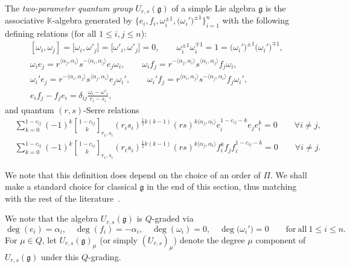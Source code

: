 \documentclass[pdftex]{sigma}
\numberwithin{equation}{section}
\newcommand{\qbinom}{\genfrac{[}{]}{0pt}{}}
\newcommand{\fg}{\mathfrak{g}}
\begin{document}
\begin{Definition}\label{def:general_2param}
The \textit{two-parameter quantum group} $U_{r,s}(\fg)$ of a simple Lie algebra $\fg$ is the associative $\mathbb{K}$-algebra generated by $\bigl\{e_{i},f_{i},\omega_{i}^{\pm 1},\bigl(\omega_{i}'\bigr)^{\pm 1}\bigr\}_{i=1}^{n}$ with the following defining relations (for all $1\leq i,j\leq n$):
\begin{gather}\label{eq:R1}
 [\omega_i,\omega_j]=\bigl[\omega_i,\omega'_j\bigr]=\bigl[\omega'_i,\omega'_j\bigr]=0, \qquad
 \omega_{i}^{\pm 1}\omega_{i}^{\mp 1} = 1 = \bigl(\omega_{i}'\bigr)^{\pm 1}\bigl(\omega_{i}'\bigr)^{\mp 1},
\\ \label{eq:R2}
 \omega_{i}e_{j} = r^{\langle \alpha_{j},\alpha_{i}\rangle}s^{-\langle \alpha_{i},\alpha_{j}\rangle}e_{j}\omega_{i}, \qquad
 \omega_{i}f_{j} = r^{-\langle \alpha_{j},\alpha_{i}\rangle}s^{\langle \alpha_{i},\alpha_{j}\rangle}f_{j}\omega_{i},
\\ \label{eq:R3}
 \omega_{i}'e_{j} = r^{-\langle \alpha_{i},\alpha_{j}\rangle}s^{\langle \alpha_{j},\alpha_{i}\rangle}e_{j}\omega_{i}', \qquad
 \omega_{i}'f_{j} = r^{\langle \alpha_{i},\alpha_{j}\rangle}s^{-\langle \alpha_{j},\alpha_{i}\rangle}f_{j}\omega_{i}',
\\ \label{eq:R4}
 e_{i}f_{j} - f_{j}e_{i} = \delta_{ij}\frac{\omega_i-\omega'_i}{r_{i} - s_{i}},
\end{gather}
and quantum $(r,s)$-Serre relations
\begin{align}
 &\sum_{k = 0}^{1 - c_{ij}}(-1)^k\qbinom{1 - c_{ij}}{k}_{r_{i},s_{i}}(r_{i}s_{i})^{\frac{1}{2}k(k-1)}(rs)^{k\langle \alpha_{j},\alpha_{i}\rangle}e_{i}^{1 - c_{ij} - k}e_{j}e_{i}^{k}=0
 \qquad \forall i\ne j, \nonumber\\
 &\sum_{k = 0}^{1 - c_{ij}}(-1)^k\qbinom{1 - c_{ij}}{k}_{r_{i},s_{i}}(r_{i}s_{i})^{\frac{1}{2}k(k-1)}(rs)^{k\langle \alpha_{j},\alpha_{i}\rangle} f_{i}^{k}f_{j}f_{i}^{1 - c_{ij} - k}=0
 \qquad \forall i\ne j.\label{eq:R5}
\end{align}
\end{Definition}

\begin{Remark}
We note that this definition does depend on the choice of an order of $\Pi$. We shall make a standard choice for classical $\fg$ in the end of this section, thus matching with the rest of the literature~\cite{BW1,BGH1}.
\end{Remark}

We note that the algebra $U_{r,s}(\mathfrak{g})$ is $Q$-graded via
\begin{displaymath}
 \deg(e_{i})=\alpha_i,\quad \deg(f_i)=-\alpha_i, \quad
 \deg(\omega_{i})=0, \quad \deg\bigl(\omega_{i}'\bigr)=0 \qquad \mathrm{for\ all} \ 1\leq i\leq n.
\end{displaymath}
For $\mu\in Q$, let $U_{r,s}(\fg)_{\mu}$ \big(or simply $(U_{r,s})_{\mu}$\big) denote the degree $\mu$ component of $U_{r,s}(\fg)$ under this $Q$-grading.
\end{document}
